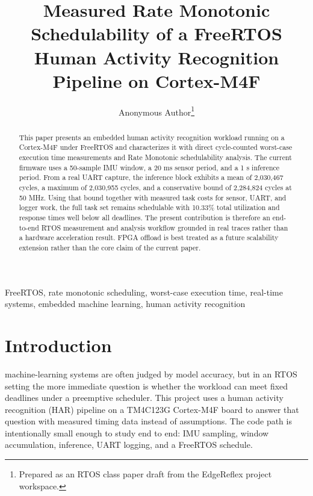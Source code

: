 \documentclass[journal]{IEEEtran}
\begin{document}
\title{Measured Rate Monotonic Schedulability of a FreeRTOS Human Activity Recognition Pipeline on Cortex-M4F}

\author{Anonymous Author\thanks{Prepared as an RTOS class paper draft from the EdgeReflex project workspace.}}


\maketitle

\begin{abstract}
This paper presents an embedded human activity recognition workload running on a Cortex-M4F under FreeRTOS and characterizes it with direct cycle-counted worst-case execution time measurements and Rate Monotonic schedulability analysis. The current firmware uses a 50-sample IMU window, a 20 ms sensor period, and a 1 s inference period. From a real UART capture, the inference block exhibits a mean of 2,030,467 cycles, a maximum of 2,030,955 cycles, and a conservative bound of 2,284,824 cycles at 50 MHz. Using that bound together with measured task costs for sensor, UART, and logger work, the full task set remains schedulable with 10.33\% total utilization and response times well below all deadlines. The present contribution is therefore an end-to-end RTOS measurement and analysis workflow grounded in real traces rather than a hardware acceleration result. FPGA offload is best treated as a future scalability extension rather than the core claim of the current paper.
\end{abstract}

\begin{IEEEkeywords}
FreeRTOS, rate monotonic scheduling, worst-case execution time, real-time systems, embedded machine learning, human activity recognition
\end{IEEEkeywords}

\section{Introduction}
 machine-learning systems are often judged by model accuracy, but in an RTOS setting the more immediate question is whether the workload can meet fixed deadlines under a preemptive scheduler. This project uses a human activity recognition (HAR) pipeline on a TM4C123G Cortex-M4F board to answer that question with measured timing data instead of assumptions. The code path is intentionally small enough to study end to end: IMU sampling, window accumulation, inference, UART logging, and a FreeRTOS schedule.
\end{document}
